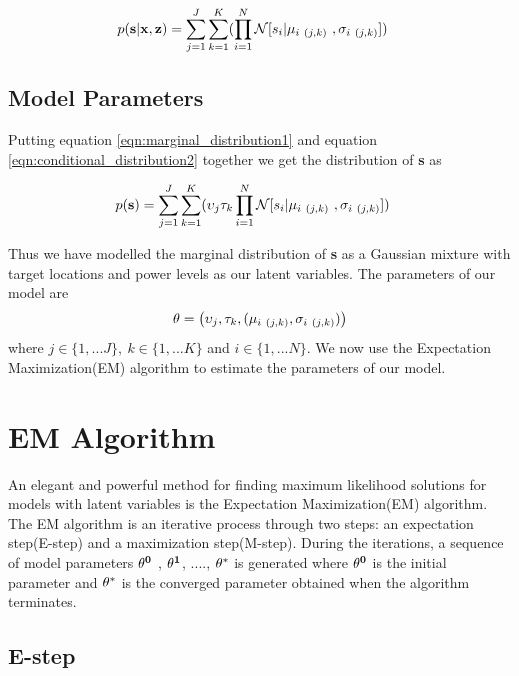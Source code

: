 \documentclass{Localization-PaperWriteupDraft}
\begin{document}
\begin{align}
p( {\bf s} | {\bf x}, {\bf z}) & =  \sum_{j=1}^J \sum_{k=1}^K (
		\prod_{i=1}^N {\it \mathcal  N}[ {s_{i}} | \mu_{i \ (j,k)} \ ,
		\sigma_{i \ (j,k)}] ) \label{eqn:conditional_distribution2}
\end{align}

\subsection{Model Parameters}
\label{subsec:modelparameters}

Putting equation \ref{eqn:marginal_distribution1} and equation
\ref{eqn:conditional_distribution2} together we get the distribution of
{\bf s} as

\begin{align}
p( {\bf s}) &= \sum_{j=1}^J \sum_{k=1}^K ( \upsilon_{j} \tau_{k} \prod_{i=1}^N {\it \mathcal  N}[ {s_{i}} | \mu_{i \ (j,k)} \ ,
		\sigma_{i \ (j,k)}] )
\end{align}

Thus we have modelled the marginal distribution of {\bf s} as a Gaussian
mixture with target locations and power levels as our latent variables. The parameters of our model are 
\begin{align}
{\bf \theta} = \left( \upsilon_{j} , \tau_{k}, (\mu_{i \ (j,k)} , \sigma_{i \ (j,k)} )\right)
\end{align}
where $j\in\{1,...J\},\ k \in\{1,...K\}$ and $i\in \{1,...N\}$. We now use the  Expectation Maximization(EM) algorithm to estimate the parameters of our model.

\section{EM Algorithm}
\label{sec:emalgorithm}

An elegant and powerful method for finding maximum likelihood solutions
for models with latent variables is the Expectation Maximization(EM)
	algorithm. The EM algorithm is an iterative process through two
	steps: an expectation step(E-step) and a maximization step(M-step). During the iterations, a sequence of model parameters ${\bf \theta^{0}}$
, ${\bf \theta^{1}}$, ...., ${\bf \theta^{*}}$ is generated where ${\bf \theta^{0}}$ is the initial parameter and ${\bf \theta^{*}}$ is the converged parameter obtained when the algorithm terminates.

\subsection{E-step}
\label{subsec:estep}
\end{document}
